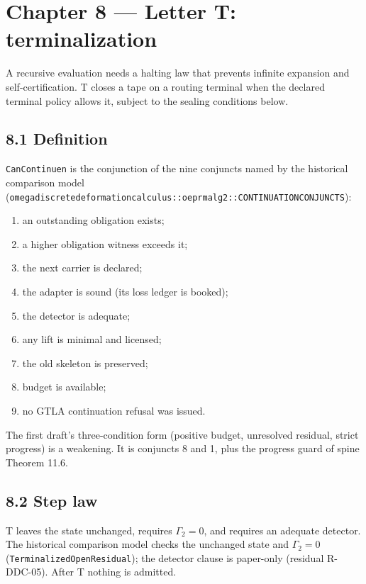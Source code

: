 \documentclass[
  11pt,
]{article}
\providecommand{\tightlist}{%
  \setlength{\itemsep}{0pt}\setlength{\parskip}{0pt}}
\renewcommand{\_}{\ddcunderscore\allowbreak}
\begin{document}
\section{Chapter 8 --- Letter T: terminalization}\label{chapter-8}

A recursive evaluation needs a halting law that prevents infinite
expansion and self-certification. T closes a tape on a routing terminal
when the declared terminal policy allows it, subject to the sealing
conditions below.

\subsection{8.1 Definition}\label{definition-8}

\texttt{Can\allowbreak Continue\_n} is the conjunction of the nine conjuncts named
by the historical comparison model
(\texttt{omega\_discrete\_deformation\_calculus::oeprmalg2::CONTINUATION\_CONJUNCTS}):

\begin{enumerate}
\def\labelenumi{\arabic{enumi}.}
\tightlist
\item
  an outstanding obligation exists;
\item
  a higher obligation witness exceeds it;
\item
  the next carrier is declared;
\item
  the adapter is sound (its loss ledger is booked);
\item
  the detector is adequate;
\item
  any lift is minimal and licensed;
\item
  the old skeleton is preserved;
\item
  budget is available;
\item
  no GTLA continuation refusal was issued.
\end{enumerate}

The first draft's three-condition form (positive budget, unresolved
residual, strict progress) is a weakening. It is conjuncts 8 and 1, plus
the progress guard of spine Theorem 11.6.

\subsection{8.2 Step law}\label{step-law-7}

T leaves the state unchanged, requires \(\Gamma_2 = 0\), and requires an
adequate detector. The historical comparison model checks the unchanged
state and \(\Gamma_2 = 0\) (\texttt{Terminalized\allowbreak Open\allowbreak Residual}); the
detector clause is paper-only (residual R-DDC-05). After T nothing is
admitted.
\end{document}
